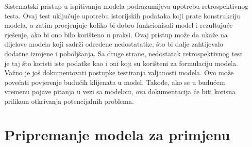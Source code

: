 \documentclass[a4paper, utf8, 11pt, colorlinks]{book}
\theoremstyle{definition}
\begin{document}
Sistematski pristup u ispitivanju modela podrazumijeva upotrebu retrospektivnog testa. Ovaj test uključuje upotrebu istorijskih podataka koji prate konstrukciju modela, a zatim procjenjuje koliko bi dobro funkcionisali model i rezultujuće rješenje, ako bi ono  bilo korišteno u praksi.  Ovaj pristup može da ukaže na dijelove modela koji sadrži određene nedostatatke, što bi dalje zahtijevalo dodatne izmjene i poboljšanja. 
Sa druge strane, nedostatak retrospektivnog test je taj što koristi iste podatke kao i oni koji su korišteni za formulaciju modela. %
Važno je još dokumentovati postupke testiranja valjanosti modela. Ovo može  povećati povjerenje budućih klijenata u model. Takođe, ako se u budućem vremenu pojave pitanja u vezi sa modelom, ova dokumentacija će  biti korisna prilikom otkrivanja potencijalnih problema. 

\section{Pripremanje modela za primjenu}
 
\end{document}
